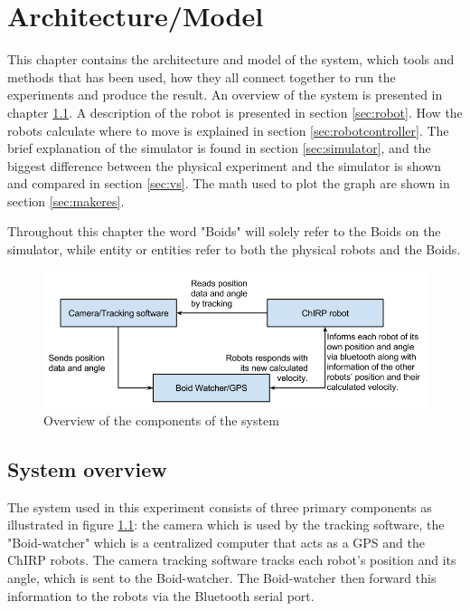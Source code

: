 \chapter{Architecture/Model}
\label{cha:architectureAndModel}
This chapter contains the architecture and model of the system, which tools and methods that has been used, how they all connect together to run the experiments and produce the result.
An overview of the system is presented in chapter \ref{sec:overview}. A description of the robot is presented in section \ref{sec:robot}. How the robots calculate where to move is explained in section \ref{sec:robotcontroller}. The brief explanation of the simulator is found in section \ref{sec:simulator}, and the biggest difference between the physical experiment and the simulator is shown and compared in section \ref{sec:vs}. The math used to plot the graph are shown in section \ref{sec:makeres}.

Throughout this chapter the word "Boids" will solely refer to the Boids on the simulator, while entity or entities refer to both the physical robots and the Boids.

\begin{figure}[h]
\begin{center}
\includegraphics[width=\linewidth]{figs/system_overview}
\end{center}
\caption[System overview]{Overview of the components of the system}
\label{fig:overview}
\end{figure}

\section{System overview}
\label{sec:overview}

The system used in this experiment consists of three primary components as illustrated in figure \ref{fig:overview}: the camera which is used by the tracking software, the "Boid-watcher" which is a centralized computer that acts as a GPS and the ChIRP robots.
The camera tracking software tracks each robot's position and its angle, which is sent to the Boid-watcher. The Boid-watcher then forward this information to the robots via the Bluetooth serial port.


